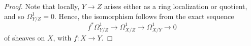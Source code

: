 \begin{proof}
	Note that locally, $Y \to Z$ arises either as a ring localization or quotient, and so $\Omega^1_{Y/Z} = 0$. Hence, the isomorphism follows from the exact sequence
	\[ f^\ast\Omega^1_{Y/Z} \to \Omega^1_{X/Z} \to \Omega^1_{X/Y} \to 0 \]
	of sheaves on $X$, with $f : X \to Y$.
\end{proof}
